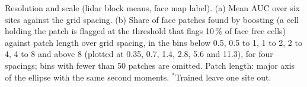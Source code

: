 Resolution and scale (lidar block means, face map label). (a) Mean AUC over six sites against the grid spacing. (b) Share of face patches found by boosting (a cell holding the patch is flagged at the threshold that flags 10\,\% of face free cells) against patch length over grid spacing, in the bins below 0.5, 0.5 to 1, 1 to 2, 2 to 4, 4 to 8 and above 8 (plotted at 0.35, 0.7, 1.4, 2.8, 5.6 and 11.3), for four spacings; bins with fewer than 50 patches are omitted. Patch length: major axis of the ellipse with the same second moments. $^{*}$Trained leave one site out.
